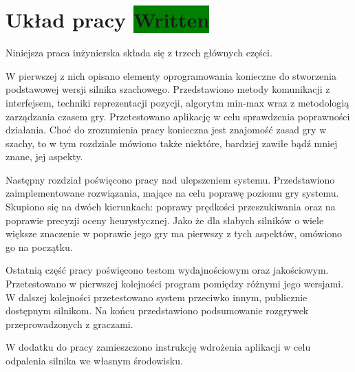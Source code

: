 \section{Układ pracy \colorbox{green}{Written}}
\label{sec:uklad-pracy}

Niniejsza praca inżynierska składa się z trzech głównych części.

W pierwszej z nich opisano elementy oprogramowania konieczne do stworzenia podstawowej wersji silnika szachowego.
Przedstawiono metody komunikacji z interfejsem, techniki reprezentacji pozycji, algorytm min-max wraz z metodologią zarządzania czasem gry.
Przetestowano aplikację w celu sprawdzenia poprawności działania.
Choć do zrozumienia pracy konieczna jest znajomość zasad gry w szachy, to w tym rozdziale mówiono także niektóre, bardziej zawiłe bądź mniej znane, jej aspekty.

Następny rozdział poświęcono pracy nad ulepszeniem systemu.
Przedstawiono zaimplementowane rozwiązania, mające na celu poprawę poziomu gry systemu.
Skupiono się na dwóch kierunkach: poprawy prędkości przeszukiwania oraz na poprawie precyzji oceny heurystycznej.
Jako że dla słabych silników o wiele większe znaczenie w poprawie jego gry ma pierwszy z tych aspektów, omówiono go na początku.


Ostatnią część pracy poświęcono testom wydajnościowym oraz jakościowym.
Przetestowano w pierwszej kolejności program pomiędzy różnymi jego wersjami.
W dalszej kolejności przetestowano system przeciwko innym, publicznie dostępnym silnikom.
Na końcu przedstawiono podsumowanie rozgrywek przeprowadzonych z graczami.

W dodatku do pracy zamieszczono instrukcję wdrożenia aplikacji w celu odpalenia silnika we własnym środowisku.